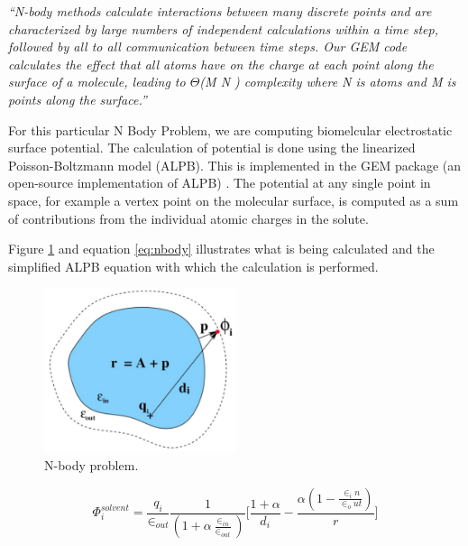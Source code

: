 \par{\emph{``N-body methods calculate interactions between many discrete points 
    and are characterized by large numbers of independent calculations 
    within a time step, followed by all to all communication between time 
    steps. Our GEM code calculates the effect that all atoms have on the 
    charge at each point along the surface of a molecule, leading to 
    $\Theta$(M \times N ) complexity where N is atoms and M is points 
    along the surface.''}\cite{dwarfs}}

\par{For this particular N Body Problem, we are computing biomelcular 
    electrostatic surface potential. The calculation of potential 
    is done using the linearized Poisson-Boltzmann model (ALPB). 
    This is implemented in the GEM package 
    (an open-source implementation of ALPB) . The potential at any 
    single point in space, for example a vertex point on the molecular 
    surface, is computed as a sum of contributions from the individual 
    atomic charges in the solute.}

\par{Figure \ref{nbody} and equation \ref{eq:nbody} illustrates what is 
    being calculated and the simplified ALPB equation with which 
    the calculation is performed.}

\begin{figure}[!h]
    \centering
    \includegraphics[width=0.5\textwidth]{figures/nbody.png}
    \caption{N-body problem.}
    \label{nbody}
\end{figure}

\begin{equation} \label{eq:nbody}
    \Phi_i^{solvent} = \frac{q_i}{\in_{out}}\frac{1}{(1+\alpha\frac{\in_{in}}
                        {\in_{out}})}\Bigg[\frac{1+\alpha}{d_i}-
                        \frac{\alpha(1-\frac{\in_in}{\in_out})}{r}\Bigg]
\end{equation}

